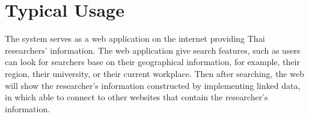 \section{Typical Usage}
\label{sec:usage}
The system serves as a web application on the internet providing Thai researchers' information. The web application give search features, such as users can look for searchers base on their geographical information, for example, their region, their university, or their current workplace. Then after searching, the web will show the researcher's information constructed by implementing linked data, in which able to connect to other websites that contain the researcher's information. 